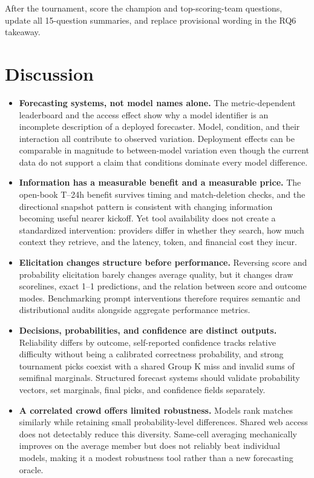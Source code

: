 \documentclass[sigconf,review]{acmart}
\newenvironment{draftbullets}
  {\begin{itemize}[leftmargin=1.25em,itemsep=1.5pt,topsep=2pt,parsep=0pt,partopsep=0pt]}
  {\end{itemize}}
\newcommand{\TODO}[1]{{\color{red}#1}}
\begin{document}
\TODO{After the tournament, score the champion and top-scoring-team questions, update all 15-question summaries, and replace provisional wording in the RQ6 takeaway.}

\section{Discussion}

\begin{draftbullets}
  \item \textbf{Forecasting systems, not model names alone.} The metric-dependent leaderboard and the
  access effect show why a model identifier is an incomplete description of a deployed forecaster.
  Model, condition, and their interaction all contribute to observed variation. Deployment effects
  can be comparable in magnitude to between-model variation even though the current data do not
  support a claim that conditions dominate every model difference.

  \item \textbf{Information has a measurable benefit and a measurable price.} The open-book T--24h
  benefit survives timing and match-deletion checks, and the directional snapshot pattern is
  consistent with changing information becoming useful nearer kickoff. Yet tool availability does
  not create a standardized intervention: providers differ in whether they search, how much context
  they retrieve, and the latency, token, and financial cost they incur.

  \item \textbf{Elicitation changes structure before performance.} Reversing score and probability
  elicitation barely changes average quality, but it changes draw scorelines, exact 1--1 predictions,
  and the relation between score and outcome modes. Benchmarking prompt interventions therefore
  requires semantic and distributional audits alongside aggregate performance metrics.

  \item \textbf{Decisions, probabilities, and confidence are distinct outputs.} Reliability differs by
  outcome, self-reported confidence tracks relative difficulty without being a calibrated correctness
  probability, and strong tournament picks coexist with a shared Group K miss and invalid sums of
  semifinal marginals. Structured forecast systems should validate probability vectors, set
  marginals, final picks, and confidence fields separately.

  \item \textbf{A correlated crowd offers limited robustness.} Models rank matches similarly while
  retaining small probability-level differences. Shared web access does not detectably reduce this
  diversity. Same-cell averaging mechanically improves on the average member but does not reliably
  beat individual models, making it a modest robustness tool rather than a new forecasting oracle.


\end{draftbullets}
\end{document}
